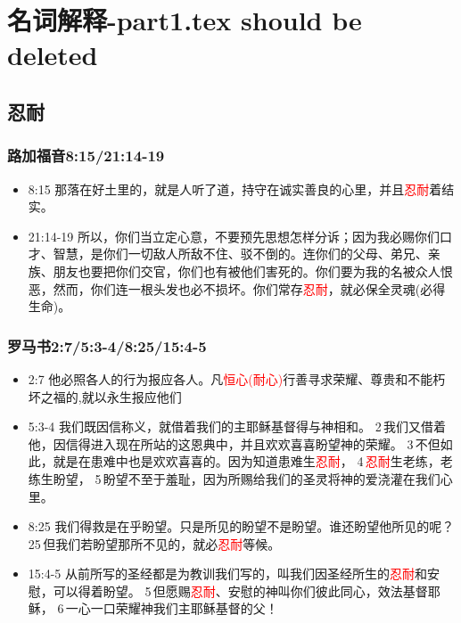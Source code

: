 
\section{名词解释-part1.tex should be deleted}

\subsection{忍耐}
\subsubsection{路加福音8:15/21:14-19}
\begin{itemize}[noitemsep]
\item 8:15 那落在好土里的，就是人听了道，持守在诚实善良的心里，并且\textcolor{red}{忍耐}着结实。
\item 21:14-19 所以，你们当立定心意，不要预先思想怎样分诉；因为我必赐你们口才、智慧，是你们一切敌人所敌不住、驳不倒的。连你们的父母、弟兄、亲族、朋友也要把你们交官，你们也有被他们害死的。你们要为我的名被众人恨恶，然而，你们连一根头发也必不损坏。你们常存\textcolor{red}{忍耐}，就必保全灵魂(必得生命)。
\end{itemize}


\subsubsection{罗马书2:7/5:3-4/8:25/15:4-5} 
\begin{itemize}[noitemsep]
\item 2:7 他必照各人的行为报应各人。凡\textcolor{red}{恒心(耐心)}行善寻求荣耀、尊贵和不能朽坏之福的,就以永生报应他们
\item 5:3-4 我们既因信称义，就借着我们的主耶稣基督得与神相和。 2 我们又借着他，因信得进入现在所站的这恩典中，并且欢欢喜喜盼望神的荣耀。 3 不但如此，就是在患难中也是欢欢喜喜的。因为知道患难生\textcolor{red}{忍耐}， 4 \textcolor{red}{忍耐}生老练，老练生盼望， 5 盼望不至于羞耻，因为所赐给我们的圣灵将神的爱浇灌在我们心里。
\item 8:25 我们得救是在乎盼望。只是所见的盼望不是盼望。谁还盼望他所见的呢？25 但我们若盼望那所不见的，就必\textcolor{red}{忍耐}等候。
\item 15:4-5 从前所写的圣经都是为教训我们写的，叫我们因圣经所生的\textcolor{red}{忍耐}和安慰，可以得着盼望。 5 但愿赐\textcolor{red}{忍耐}、安慰的神叫你们彼此同心，效法基督耶稣， 6 一心一口荣耀神我们主耶稣基督的父！
\end{itemize}


